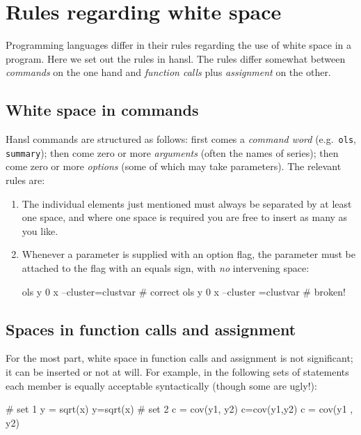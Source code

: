
\chapter{Rules regarding white space}

Programming languages differ in their rules regarding the use of white
space in a program. Here we set out the rules in hansl.  The rules
differ somewhat between \textit{commands} on the one hand and
\textit{function calls} plus \textit{assignment} on the other.

\section{White space in commands}

Hansl commands are structured as follows: first comes a
\textit{command word} (e.g.\ \texttt{ols}, \texttt{summary}); then
come zero or more \textit{arguments} (often the names of series); then
come zero or more \textit{options} (some of which may take
parameters). The relevant rules are:
\begin{enumerate}
\item The individual elements just mentioned must always be separated
  by at least one space, and where one space is required you are free
  to insert as many as you like.
\item Whenever a parameter is supplied with an option flag, the
  parameter must be attached to the flag with an equals sign, with
  \textit{no} intervening space:
\begin{code}
ols y 0 x --cluster=clustvar  # correct
ols y 0 x --cluster =clustvar # broken!
\end{code}
\end{enumerate}

\section{Spaces in function calls and assignment}

For the most part, white space in function calls and assignment is not
significant; it can be inserted or not at will. For example, in the
following sets of statements each member is equally acceptable
syntactically (though some are ugly!):
\begin{code}
# set 1
y = sqrt(x)
y=sqrt(x)
# set 2
c = cov(y1, y2)
c=cov(y1,y2)
c  = cov(y1 , y2)
\end{code}

